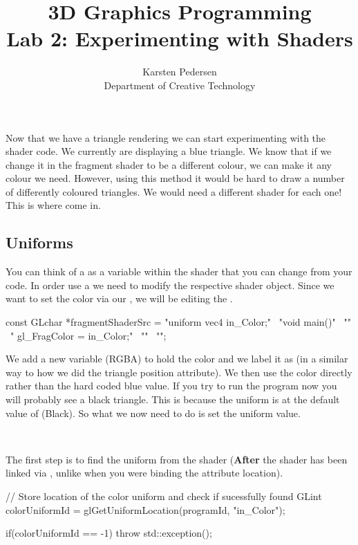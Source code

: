 \documentclass[10pt]{article}
\begin{document}
\title{3D Graphics Programming \\
  \large Lab 2: Experimenting with Shaders}

\author{Karsten Pedersen\\ Department of Creative Technology}
\maketitle

Now that we have a triangle rendering we can start experimenting with
the shader code. We currently are displaying a blue triangle. We know
that if we change it in the fragment shader to be a different colour,
we can make it any colour we need. However, using this method it would
be hard to draw a number of differently coloured triangles. We would
need a different shader for each one! This is where  come in.

\subsection*{Uniforms}

You can think of a  as a variable within the shader that you
can change from your  code.  In order use a 
we need to modify the respective shader object. Since we want to set
the color via our , we will be editing the .

\begin{Code}
const GLchar *fragmentShaderSrc =
  "uniform vec4 in_Color;" \
  "void main()" \
  "{" \
  "  gl_FragColor = in_Color;" \
  "}" \
  "";
\end{Code}

We add a new  variable (RGBA) to hold the color and
we label it as  (in a similar way to how we did the
triangle position attribute).  We then use the color directly rather
than the hard coded blue value.  If you try to run the program now you
will probably see a black triangle. This is because the uniform is at
the default value of \Command{(0, 0, 0, 0)} (Black). So what we now need to do
is set the uniform value.

\

The first step is to find the uniform from the shader (\textbf{After}
the shader has been linked via , unlike when you
were binding the attribute location).

\begin{Code}
// Store location of the color uniform and check if sucessfully found
GLint colorUniformId = glGetUniformLocation(programId, "in_Color");

if(colorUniformId == -1)
{
  throw std::exception();
}
\end{Code}
\end{document}
